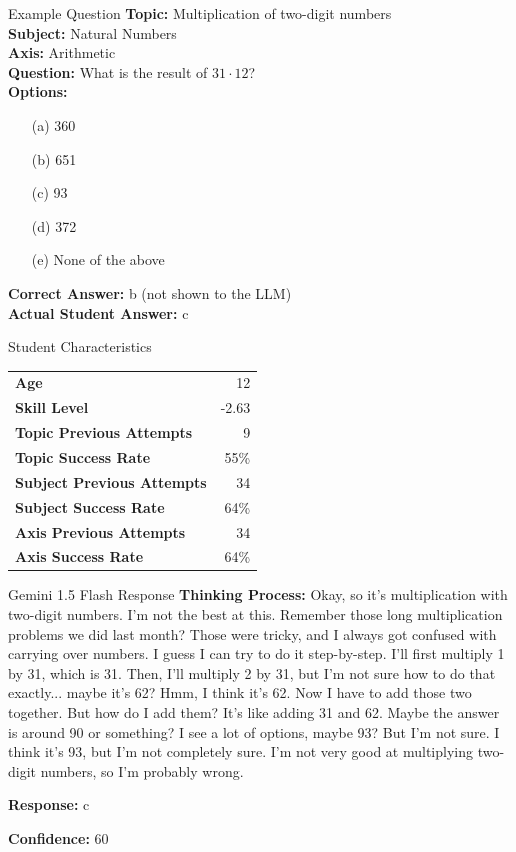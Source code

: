 \documentclass[
    a4paper, %
    10pt, %
    twoside, %
]{LTJournalArticle}
\begin{document}
\begin{questionbox}{Example Question}
    \textbf{Topic:} Multiplication of two-digit numbers \\
    \textbf{Subject:} Natural Numbers \\
    \textbf{Axis:} Arithmetic \\
    
    \textbf{Question:} What is the result of $31 \cdot 12$? \\
    
    \textbf{Options:}
    \begin{itemize}
        \item[(a)] 360
        \item[(b)] 651
        \item[(c)] 93
        \item[(d)] 372
        \item[(e)] None of the above
    \end{itemize}
    
    \textbf{Correct Answer:} b (not shown to the LLM)\\
    \textbf{Actual Student Answer:} c

\end{questionbox}

\begin{studentbox}{Student Characteristics}
    \begin{tabularx}{\textwidth}{Xr}
        \textbf{Age} & 12 \\
        \textbf{Skill Level} & -2.63 \\
        \textbf{Topic Previous Attempts} & 9 \\
        \textbf{Topic Success Rate} & 55\% \\
        \textbf{Subject Previous Attempts} & 34 \\
        \textbf{Subject Success Rate} & 64\% \\
        \textbf{Axis Previous Attempts} & 34 \\
        \textbf{Axis Success Rate} & 64\% \\
    \end{tabularx}
\end{studentbox}

\begin{llmbox}{Gemini 1.5 Flash Response}
    \textbf{Thinking Process:} Okay, so it's multiplication with two-digit numbers.  I'm not the best at this.  Remember those long multiplication problems we did last month?  Those were tricky, and I always got confused with carrying over numbers. I guess I can try to do it step-by-step. I'll first multiply 1 by 31, which is 31. Then, I'll multiply 2 by 31, but I'm not sure how to do that exactly... maybe it's 62?  Hmm, I think it's 62. Now I have to add those two together.  But how do I add them? It's like adding 31 and 62. Maybe the answer is around 90 or something? I see a lot of options, maybe 93? But I'm not sure.  I think it's 93, but I'm not completely sure.  I'm not very good at multiplying two-digit numbers, so I'm probably wrong.
    
    \textbf{Response:} c
    
    \textbf{Confidence:} 60
\end{llmbox}
\end{document}
